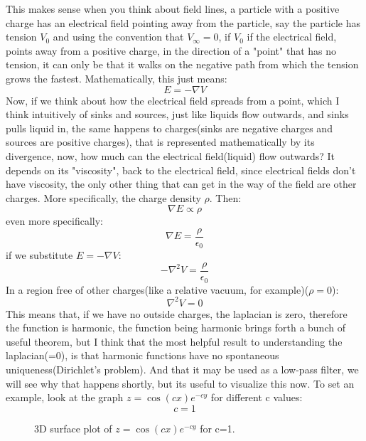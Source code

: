 \documentclass[12pt]{article}
\begin{document}
This makes sense when you think about field lines, a particle with a positive charge has an electrical field pointing away from the particle, say the particle has tension \(V_0\) and using the convention that \(V_\infty =0\), if \(V_0\) if the electrical field, points away from a positive charge, in the direction of a "point" that has no tension, it can only be that it walks on the negative path from which the tension grows the fastest. Mathematically, this just means:
\[E=-\nabla V\]
Now, if we think about how the electrical field spreads from a point, which I think intuitively of sinks and sources, just like liquids flow outwards, and sinks pulls liquid in, the same happens to charges(sinks are negative charges and sources are positive charges), that is represented mathematically by its divergence, now, how much can the electrical field(liquid) flow outwards? It depends on its "viscosity", back to the electrical field, since electrical fields don't have viscosity, the only other thing that can get in the way of the field are other charges. More specifically, the charge density \(\rho\). Then:
\[\nabla E\propto \rho\]
even more specifically:
\[\nabla E=\frac{\rho}{\epsilon_0}\]
if we substitute \(E=-\nabla V\):
\[-\nabla^2 V=\frac{\rho}{\epsilon_0}\]
In a region free of other charges(like a relative vacuum, for example)(\(\rho=0\)):
\[\nabla^2V=0\]
This means that, if we have no outside charges, the laplacian is zero, therefore the function is harmonic, the function being harmonic brings forth a bunch of useful theorem, but I think that the most helpful result to understanding the laplacian(=0), is that harmonic functions have no spontaneous uniqueness(Dirichlet's problem). And that it may be used as a low-pass filter, we will see why that happens shortly, but its useful to visualize this now.
\newline 
To set an example,
look at the graph \(z=\cos(cx)e^{-cy}\) for different c values:
\[c=1\]
\begin{figure}[H]
\centering
{}
\caption{3D surface plot of $z=\cos(cx)e^{-cy}$ for c=1.}
\label{fig:cos_exp_surface}
\end{figure}
\end{document}
